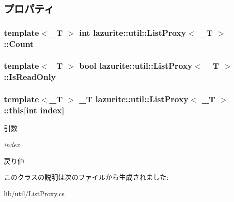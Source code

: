 \subsection{プロパティ}
\hypertarget{classlazurite_1_1util_1_1_list_proxy_3_01___t_01_4_a50a35def3ef431c0d20e77b4a9462bfa}{
\subsubsection[{Count}]{\setlength{\rightskip}{0pt plus 5cm}template$<$\_\-T $>$ int lazurite::util::ListProxy$<$ \_\-T $>$::Count}}
\label{classlazurite_1_1util_1_1_list_proxy_3_01___t_01_4_a50a35def3ef431c0d20e77b4a9462bfa}
\hypertarget{classlazurite_1_1util_1_1_list_proxy_3_01___t_01_4_aec7177935c783acbb65424f26995a664}{
\subsubsection[{IsReadOnly}]{\setlength{\rightskip}{0pt plus 5cm}template$<$\_\-T $>$ bool lazurite::util::ListProxy$<$ \_\-T $>$::IsReadOnly}}
\label{classlazurite_1_1util_1_1_list_proxy_3_01___t_01_4_aec7177935c783acbb65424f26995a664}
\hypertarget{classlazurite_1_1util_1_1_list_proxy_3_01___t_01_4_aac0c88177c53164d656e44f500bb688c}{
\subsubsection[{this}]{\setlength{\rightskip}{0pt plus 5cm}template$<$\_\-T $>$ \_\-T lazurite::util::ListProxy$<$ \_\-T $>$::this\mbox{[}int index\mbox{]}}}
\label{classlazurite_1_1util_1_1_list_proxy_3_01___t_01_4_aac0c88177c53164d656e44f500bb688c}

\begin{DoxyParams}{引数}
\item[{\em index}]\end{DoxyParams}
\begin{DoxyReturn}{戻り値}

\end{DoxyReturn}


このクラスの説明は次のファイルから生成されました:\begin{DoxyCompactItemize}
\item 
lib/util/ListProxy.cs\end{DoxyCompactItemize}
